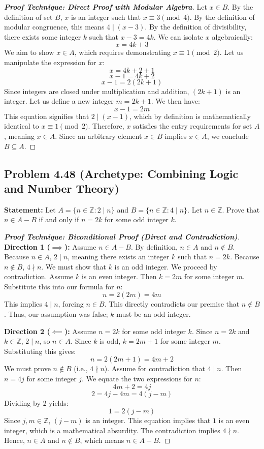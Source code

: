 \documentclass[11pt]{article}
\begin{document}
\begin{proof}[\textbf{Proof Technique: Direct Proof with Modular Algebra}]
Let $x \in B$. By the definition of set $B$, $x$ is an integer such that $x \equiv 3 \pmod 4$.
By the definition of modular congruence, this means $4 \mid (x - 3)$.
By the definition of divisibility, there exists some integer $k$ such that $x - 3 = 4k$.
We can isolate $x$ algebraically:
\[ x = 4k + 3 \]
We aim to show $x \in A$, which requires demonstrating $x \equiv 1 \pmod 2$. Let us manipulate the expression for $x$:
\[ x = 4k + 2 + 1 \]
\[ x - 1 = 4k + 2 \]
\[ x - 1 = 2(2k + 1) \]
Since integers are closed under multiplication and addition, $(2k + 1)$ is an integer. Let us define a new integer $m = 2k + 1$. We then have:
\[ x - 1 = 2m \]
This equation signifies that $2 \mid (x - 1)$, which by definition is mathematically identical to $x \equiv 1 \pmod 2$.
Therefore, $x$ satisfies the entry requirements for set $A$, meaning $x \in A$.
Since an arbitrary element $x \in B$ implies $x \in A$, we conclude $B \subseteq A$.
\end{proof}

\subsection{Problem 4.48 (Archetype: Combining Logic and Number Theory)}
\textbf{Statement:} Let $A = \{n \in \mathbb{Z} : 2 \mid n\}$ and $B = \{n \in \mathbb{Z} : 4 \mid n\}$. Let $n \in \mathbb{Z}$. Prove that $n \in A - B$ if and only if $n = 2k$ for some odd integer $k$.

\begin{proof}[\textbf{Proof Technique: Biconditional Proof (Direct and Contradiction)}]
\textbf{Direction 1 ($\implies$):} Assume $n \in A - B$. 
By definition, $n \in A$ and $n \notin B$. 
Because $n \in A$, $2 \mid n$, meaning there exists an integer $k$ such that $n = 2k$.
Because $n \notin B$, $4 \nmid n$. 
We must show that $k$ is an odd integer. We proceed by contradiction. 
Assume $k$ is an even integer. Then $k = 2m$ for some integer $m$. 
Substitute this into our formula for $n$:
\[ n = 2(2m) = 4m \]
This implies $4 \mid n$, forcing $n \in B$. This directly contradicts our premise that $n \notin B$. Thus, our assumption was false; $k$ must be an odd integer.

\textbf{Direction 2 ($\impliedby$):} Assume $n = 2k$ for some odd integer $k$.
Since $n = 2k$ and $k \in \mathbb{Z}$, $2 \mid n$, so $n \in A$.
Since $k$ is odd, $k = 2m + 1$ for some integer $m$. Substituting this gives:
\[ n = 2(2m + 1) = 4m + 2 \]
We must prove $n \notin B$ (i.e., $4 \nmid n$). Assume for contradiction that $4 \mid n$. Then $n = 4j$ for some integer $j$. We equate the two expressions for $n$:
\[ 4m + 2 = 4j \]
\[ 2 = 4j - 4m = 4(j - m) \]
Dividing by 2 yields:
\[ 1 = 2(j - m) \]
Since $j, m \in \mathbb{Z}$, $(j - m)$ is an integer. This equation implies that $1$ is an even integer, which is a mathematical absurdity. The contradiction implies $4 \nmid n$. 
Hence, $n \in A$ and $n \notin B$, which means $n \in A - B$.
\end{proof}
\end{document}
